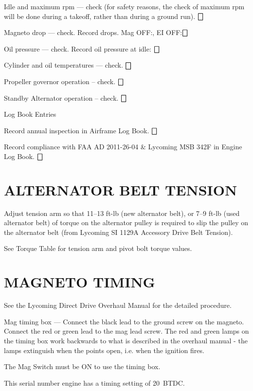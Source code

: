 \begin{enumerate*}
	\begin{enumerate*}
		\item Idle and maximum rpm --- check (for safety reasons, the check of maximum rpm will be done during a takeoff, rather than during a ground run). \dotfill $\bigbox$
		\item Magneto drop --- check. Record drops. Mag OFF:\underline{\makebox[0.5in][l]{}}, EI OFF:\underline{\makebox[0.5in][l]{}}\dotfill $\bigbox$
		\item Oil pressure --- check. Record oil pressure at idle: \underline{\makebox[0.5in][l]{}} \dotfill $\bigbox$
		\item Cylinder and oil temperatures --- check. \dotfill $\bigbox$
		\item Propeller governor operation -- check. \dotfill $\bigbox$
		\item Standby Alternator operation -- check. \dotfill $\bigbox$
	\end{enumerate*}
	\item{Log Book Entries}
	\begin{enumerate*}
		\item Record annual inspection in Airframe Log Book. \dotfill $\bigbox$
		\item Record compliance with FAA AD 2011-26-04 \& Lycoming MSB 342F in Engine Log Book. \dotfill $\bigbox$
	\end{enumerate*}
\end{enumerate*}

\section{ALTERNATOR BELT TENSION} 
\begin{enumerate*}
	\item Adjust tension arm so that 11--13 ft-lb (new alternator belt), or 7--9 ft-lb (used alternator belt) of torque on the alternator pulley is required to slip the pulley on the alternator belt (from Lycoming SI 1129A Accessory Drive Belt Tension). 
	\item See Torque Table for tension arm and pivot bolt torque values. 
\end{enumerate*}

\section{MAGNETO TIMING} 
\begin{enumerate*}
	\item See the Lycoming Direct Drive Overhaul Manual for the detailed procedure. 
	\item Mag timing box --- Connect the black lead to the ground screw on the magneto.  Connect the red or green lead to the mag lead screw.  The red and green lamps on the timing box work backwards to what is described in the overhaul manual - the lamps extinguish when the points open, i.e. when the ignition fires. 
	\item The Mag Switch must be ON to use the timing box. 
	\item This serial number engine has a timing setting of 20\textdegree ~BTDC. 
	
\end{enumerate*}

